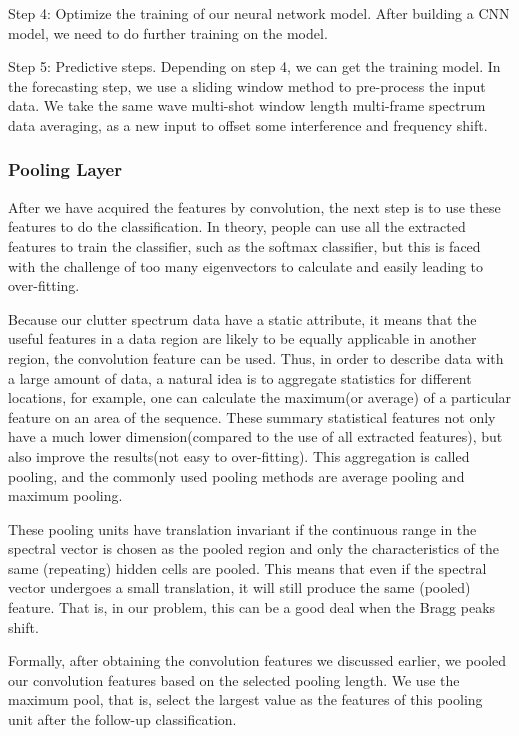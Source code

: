 Step 4: Optimize the training of our neural network model. After building a CNN model, we need to do further training on the model.

Step 5: Predictive steps. Depending on step 4, we can get the training model. In the forecasting step, we use a sliding window method to pre-process the input data. We take the same wave multi-shot window length multi-frame spectrum data averaging, as a new input to offset some interference and frequency shift.

\subsubsection{Pooling Layer}

After we have acquired the features by convolution, the next step is to use these features to do the classification. In theory, people can use all the extracted features to train the classifier, such as the softmax classifier, but this is faced with the challenge of too many eigenvectors to calculate and easily leading to over-fitting.

Because our clutter spectrum data have a static attribute, it means that the useful features in a data region are likely to be equally applicable in another region, the convolution feature can be used. Thus, in order to describe data with a large amount of data, a natural idea is to aggregate statistics for different locations, for example, one can calculate the maximum(or average) of a particular feature on an area of the sequence. These summary statistical features not only have a much lower dimension(compared to the use of all extracted features), but also improve the results(not easy to over-fitting). This aggregation is called pooling, and the commonly used pooling methods are average pooling and maximum pooling.

These pooling units have translation invariant if the continuous range in the spectral vector is chosen as the pooled region and only the characteristics of the same (repeating) hidden cells are pooled. This means that even if the spectral vector undergoes a small translation, it will still produce the same (pooled) feature. That is, in our problem, this can be a good deal when the Bragg peaks shift.

Formally, after obtaining the convolution features we discussed earlier, we pooled our convolution features based on the selected pooling length. We use the maximum pool, that is, select the largest value as the features of this pooling unit after the follow-up classification.

